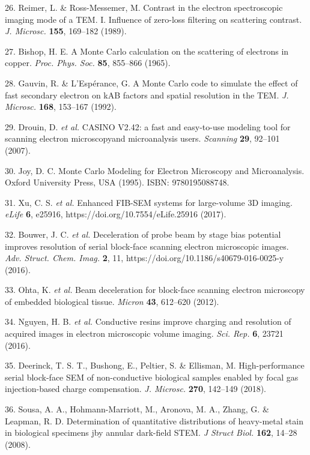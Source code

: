 \documentclass{article}
\newenvironment{reflist}{\par\small\setlength{\parindent}{0pt}\everypar{\hangindent=2.2em\hangafter=1}}{\par}
\begin{document}
\begin{reflist}
26. Reimer, L. \& Ross-Messemer, M. Contrast in the electron spectroscopic imaging mode of a TEM. I. Influence of zero-loss filtering on scattering contrast. \emph{J. Microsc.} \textbf{155}, 169–182 (1989).

27. Bishop, H. E. A Monte Carlo calculation on the scattering of electrons in copper. \emph{Proc. Phys. Soc.} \textbf{85}, 855–866 (1965).

28. Gauvin, R. \& L’Espérance, G. A Monte Carlo code to simulate the effect of fast secondary electron on kAB factors and spatial resolution in the TEM. \emph{J. Microsc.} \textbf{168}, 153–167 (1992).

29. Drouin, D. \emph{et al.} CASINO V2.42: a fast and easy-to-use modeling tool for scanning electron microscopyand microanalysis users. \emph{Scanning} \textbf{29}, 92–101 (2007).

30. Joy, D. C. Monte Carlo Modeling for Electron Microscopy and Microanalysis. Oxford University Press, USA (1995). ISBN: 9780195088748.

31. Xu, C. S. \emph{et al.} Enhanced FIB-SEM systems for large-volume 3D imaging. \emph{eLife} \textbf{6}, e25916, https://doi.org/10.7554/eLife.25916 (2017).

32. Bouwer, J. C. \emph{et al.} Deceleration of probe beam by stage bias potential improves resolution of serial block-face scanning electron microscopic images. \emph{Adv. Struct. Chem. Imag.} \textbf{2}, 11, https://doi.org/10.1186/s40679-016-0025-y (2016).

33. Ohta, K. \emph{et al.} Beam deceleration for block-face scanning electron microscopy of embedded biological tissue. \emph{Micron} \textbf{43}, 612–620 (2012).

34. Nguyen, H. B. \emph{et al.} Conductive resins improve charging and resolution of acquired images in electron microscopic volume imaging. \emph{Sci. Rep.} \textbf{6}, 23721 (2016).

35. Deerinck, T. S. T., Bushong, E., Peltier, S. \& Ellisman, M. High-performance serial block-face SEM of non-conductive biological samples enabled by focal gas injection-based charge compensation. \emph{J. Microsc.} \textbf{270}, 142–149 (2018).

36. Sousa, A. A., Hohmann-Marriott, M., Aronova, M. A., Zhang, G. \& Leapman, R. D. Determination of quantitative distributions of heavy-metal stain in biological specimens jby annular dark-field STEM. \emph{J Struct Biol.} \textbf{162}, 14–28 (2008).


\end{reflist}
\end{document}
